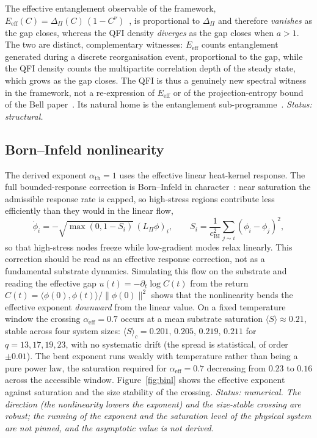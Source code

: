 \documentclass[11pt]{article}
\newcommand{\DPi}{\Delta_\Pi}
\newcommand{\Lap}{L_\Pi}
\begin{document}
The effective entanglement observable of the framework, $E_{\mathrm{eff}}(C)=\DPi(C)\,(1-C^\nu)$~\cite{Cosmochrony},
is proportional to $\DPi$ and therefore \emph{vanishes} as the gap closes, whereas the QFI density \emph{diverges}
as the gap closes when $a>1$.
The two are distinct, complementary witnesses: $E_{\mathrm{eff}}$ counts entanglement generated during a discrete
reorganisation event, proportional to the gap, while the QFI density counts the multipartite correlation depth of
the steady state, which grows as the gap closes.
The QFI is thus a genuinely new spectral witness in the framework, not a re-expression of $E_{\mathrm{eff}}$ or of
the projection-entropy bound of the Bell paper~\cite{Beau2026b}.
Its natural home is the entanglement sub-programme~\cite{Beau2026entnote, Beau2026ent1}.
\emph{Status: structural.}

\subsection{Born--Infeld nonlinearity}
\label{sec:binl}

The derived exponent $\alpha_{\mathrm{th}}=1$ uses the effective linear heat-kernel response.
The full bounded-response correction is Born--Infeld in character~\cite{Cosmochrony}: near saturation the admissible
response rate is capped, so high-stress regions contribute less efficiently than they would in the linear flow,
\begin{equation}
\dot\phi_i = -\sqrt{\max(0,1-S_i)}\,(\Lap\phi)_i,\qquad
S_i=\frac{1}{c_{\mathrm{BI}}^2}\sum_{j\sim i}(\phi_i-\phi_j)^2,
\label{eq:biflow}
\end{equation}
so that high-stress nodes freeze while low-gradient modes relax linearly.
This correction should be read as an effective response correction, not as a fundamental substrate dynamics.
Simulating this flow on the substrate and reading the effective gap $u(t)=-\partial_t\log C(t)$ from the return
$C(t)=\langle\phi(0),\phi(t)\rangle/\lVert\phi(0)\rVert^2$ shows that the nonlinearity bends the effective exponent
\emph{downward} from the linear value.
On a fixed temperature window the crossing $\alpha_{\mathrm{eff}}=0.7$ occurs at a mean substrate saturation
$\langle S\rangle\approx 0.21$, stable across four system sizes: $\langle S\rangle_c=0.201,\,0.205,\,0.219,\,0.211$
for $q=13,17,19,23$, with no systematic drift (the spread is statistical, of order $\pm 0.01$).
The bent exponent runs weakly with temperature rather than being a pure power law, the saturation required for
$\alpha_{\mathrm{eff}}=0.7$ decreasing from $0.23$ to $0.16$ across the accessible window.
Figure~\ref{fig:binl} shows the effective exponent against saturation and the size stability of the crossing.
\emph{Status: numerical. The direction (the nonlinearity lowers the exponent) and the size-stable crossing are
robust; the running of the exponent and the saturation level of the physical system are not pinned, and the
asymptotic value is not derived.}
\end{document}
